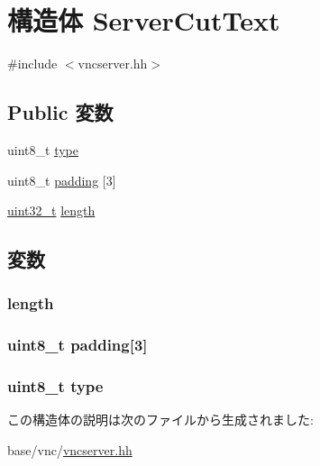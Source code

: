 \hypertarget{structVncServer_1_1ServerCutText}{
\section{構造体 ServerCutText}
\label{structVncServer_1_1ServerCutText}
}


{\ttfamily \#include $<$vncserver.hh$>$}\subsection*{Public 変数}
\begin{DoxyCompactItemize}
\item 
uint8\_\-t \hyperlink{structVncServer_1_1ServerCutText_a1d127017fb298b889f4ba24752d08b8e}{type}
\item 
uint8\_\-t \hyperlink{structVncServer_1_1ServerCutText_a735ef00341a84c02ba561c66de3d20af}{padding} \mbox{[}3\mbox{]}
\item 
\hyperlink{Type_8hh_a435d1572bf3f880d55459d9805097f62}{uint32\_\-t} \hyperlink{structVncServer_1_1ServerCutText_aebb70c2aab3407a9f05334c47131a43b}{length}
\end{DoxyCompactItemize}


\subsection{変数}
\hypertarget{structVncServer_1_1ServerCutText_aebb70c2aab3407a9f05334c47131a43b}{
\subsubsection[{length}]{ {\bf length}}}
\label{structVncServer_1_1ServerCutText_aebb70c2aab3407a9f05334c47131a43b}
\hypertarget{structVncServer_1_1ServerCutText_a735ef00341a84c02ba561c66de3d20af}{
\subsubsection[{padding}]{\setlength{\rightskip}{0pt plus 5cm}uint8\_\-t {\bf padding}\mbox{[}3\mbox{]}}}
\label{structVncServer_1_1ServerCutText_a735ef00341a84c02ba561c66de3d20af}
\hypertarget{structVncServer_1_1ServerCutText_a1d127017fb298b889f4ba24752d08b8e}{
\subsubsection[{type}]{\setlength{\rightskip}{0pt plus 5cm}uint8\_\-t {\bf type}}}
\label{structVncServer_1_1ServerCutText_a1d127017fb298b889f4ba24752d08b8e}


この構造体の説明は次のファイルから生成されました:\begin{DoxyCompactItemize}
\item 
base/vnc/\hyperlink{vncserver_8hh}{vncserver.hh}\end{DoxyCompactItemize}
